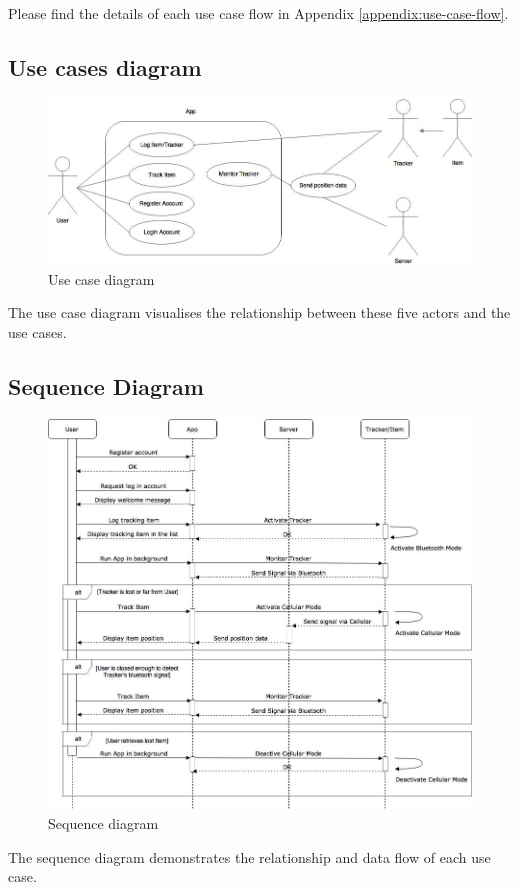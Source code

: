 \documentclass[12pt,a4paper]{article}
\begin{document}
        \paragraph{}
          Please find the details of each use case flow in Appendix \ref{appendix:use-case-flow}.
          
        \subsection{Use cases diagram}
          \begin{figure}[H]
            \centering
            \includegraphics[width=1\textwidth]{assets/5-use-case-diagram.jpg}
            \caption{Use case diagram}
            \label{fig:Use case diagram}
          \end{figure}
          The use case diagram visualises the relationship between these five actors and the use cases.

        \subsection{Sequence Diagram}
          \begin{figure}[H]
            \centering
            \includegraphics[width=1\textwidth]{assets/5-sequence-diagram.jpg}
            \caption{Sequence diagram}
            \label{fig:Sequence diagram}
          \end{figure}
          The sequence diagram demonstrates the relationship and data flow of each use case.
\end{document}
